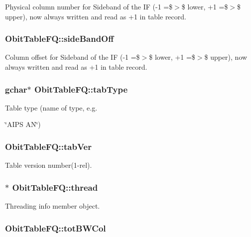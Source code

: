 Physical column number for Sideband of the IF (-1 =\$$>$\$ lower, +1 =\$$>$\$ upper), now always written and read as +1 in table record. 

\subsubsection{ {\bf Obit\-Table\-FQ::side\-Band\-Off}}\label{structObitTableFQ_o24}


Column offset for Sideband of the IF (-1 =\$$>$\$ lower, +1 =\$$>$\$ upper), now always written and read as +1 in table record. 

\subsubsection{\setlength{\rightskip}{0pt plus 5cm}gchar$\ast$ {\bf Obit\-Table\-FQ::tab\-Type}}\label{structObitTableFQ_o12}


Table type (name of type, e.g. 

\char`\"{}AIPS AN\char`\"{}) 
\subsubsection{ {\bf Obit\-Table\-FQ::tab\-Ver}}\label{structObitTableFQ_o13}


Table version number(1-rel). 

\subsubsection{$\ast$ {\bf Obit\-Table\-FQ::thread}}\label{structObitTableFQ_o4}


Threading info member object. 

\subsubsection{ {\bf Obit\-Table\-FQ::tot\-BWCol}}\label{structObitTableFQ_o23}


